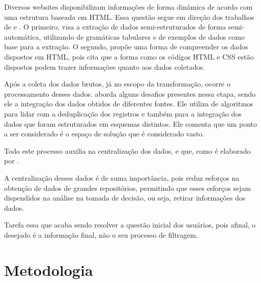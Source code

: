 Diversos websites disponibilizam informações de forma dinâmica de acordo com uma estrutura baseada em HTML. Essa questão segue em direção dos trabalhos de  e . O primeiro, visa a extração de dados semi-estruturados de forma semi-automática, utilizando de gramáticas tabulares e de exemplos de dados como base para a extração. O segundo, propõe uma forma de compreender os dados dispostos em HTML, pois cita que a forma como os códigos HTML e CSS estão dispostos podem trazer informações quanto aos dados coletados.

Após a coleta dos dados brutos, já no escopo da transformação, ocorre o processamento desses dados.  aborda alguns desafios presentes nessa etapa, sendo ele a integração dos dados obtidos de diferentes fontes. Ele utiliza de algoritmos para lidar com a deduplicação dos registros e também para a integração dos dados que foram estruturados em esquemas distintos. Ele comenta que um ponto a ser considerado é o espaço de solução que é considerado vasto.

Todo este processo auxilia na centralização dos dados, e que, como é elaborado por .

\begin{citacao}
  A centralização desses dados é de suma importância, pois reduz esforços na obtenção de dados de grandes repositórios, permitindo que esses esforços sejam dispendidos na análise na tomada de decisão, ou seja, retirar informações dos dados. \cite{2008Marcelo}
\end{citacao}

Tarefa essa que acaba sendo resolver a questão inicial dos usuários, pois afinal, o desejado é a informação final, não o seu processo de filtragem.

\section{Metodologia} %

\begin{comment}
LISTA METODOLOGIAS PARA DESENVOLVER MAIS PROFUNDAMENTE POSTERIORMENTE:
- organização do conhecimento
- mineração de dados
- visualização de informação
- Inteligência Artificial
- sistemas similares

LOCAIS PARA PESQUISAR:
- TCCs UFMG
- Pesquisas dos professores do PPGCC
- Artigos
- Livros das ementas
\end{comment}

